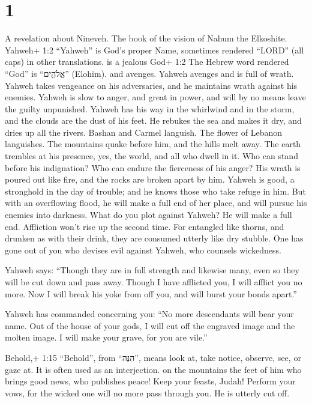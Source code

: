 \hypertarget{section}{%
\section{1}\label{section}}

 A revelation about Nineveh. The book of the vision of Nahum
the Elkoshite.  Yahweh+ 1:2 ``Yahweh'' is God's proper Name,
sometimes rendered ``LORD'' (all caps) in other translations. is a
jealous God+ 1:2 The Hebrew word rendered ``God'' is ``אֱלֹהִ֑ים''
(Elohim). and avenges. Yahweh avenges and is full of wrath. Yahweh takes
vengeance on his adversaries, and he maintains wrath against his
enemies.  Yahweh is slow to anger, and great in power, and
will by no means leave the guilty unpunished. Yahweh has his way in the
whirlwind and in the storm, and the clouds are the dust of his feet.
 He rebukes the sea and makes it dry, and dries up all the
rivers. Bashan and Carmel languish. The flower of Lebanon languishes.
 The mountains quake before him, and the hills melt away.
The earth trembles at his presence, yes, the world, and all who dwell in
it.  Who can stand before his indignation? Who can endure
the fierceness of his anger? His wrath is poured out like fire, and the
rocks are broken apart by him.  Yahweh is good, a stronghold
in the day of trouble; and he knows those who take refuge in him.
 But with an overflowing flood, he will make a full end of
her place, and will pursue his enemies into darkness.  What
do you plot against Yahweh? He will make a full end. Affliction won't
rise up the second time.  For entangled like thorns, and
drunken as with their drink, they are consumed utterly like dry stubble.
 One has gone out of you who devises evil against Yahweh,
who counsels wickedness.

 Yahweh says: ``Though they are in full strength and
likewise many, even so they will be cut down and pass away. Though I
have afflicted you, I will afflict you no more.  Now I will
break his yoke from off you, and will burst your bonds apart.''

 Yahweh has commanded concerning you: ``No more descendants
will bear your name. Out of the house of your gods, I will cut off the
engraved image and the molten image. I will make your grave, for you are
vile.''

 Behold,+ 1:15 ``Behold'', from ``הִנֵּה'', means look at,
take notice, observe, see, or gaze at. It is often used as an
interjection. on the mountains the feet of him who brings good news, who
publishes peace! Keep your feasts, Judah! Perform your vows, for the
wicked one will no more pass through you. He is utterly cut off.

